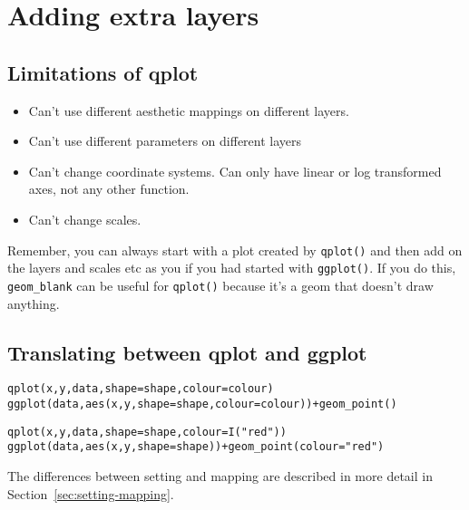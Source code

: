 


\chapter{Adding extra layers}



\section{Limitations of qplot}
\label{sec:qplot-limitations}

\begin{itemize}
  \item Can't use different aesthetic mappings on different layers.  
  \item Can't use different parameters on different layers
  \item Can't change coordinate systems.  Can only have linear or log transformed axes, not any other function.
  \item Can't change scales.
\end{itemize}

Remember, you can always start with a plot created by {\tt qplot()} and then add on the layers and scales etc as you if you had started with {\tt ggplot()}.  If you do this, {\tt geom\_blank} can be useful for {\tt qplot()} because it's a geom that doesn't draw anything.

\section{Translating between qplot and ggplot}
\label{sec:translating}


\begin{alltt}
qplot(x, y, data, shape=shape, colour = colour)
ggplot(data, aes(x, y, shape=shape, colour = colour)) + geom_point()
\end{alltt}

\begin{alltt}
qplot(x, y, data, shape=shape, colour = I("red"))
ggplot(data, aes(x, y, shape=shape)) + geom_point(colour="red")
\end{alltt}

The differences between setting and mapping are described in more detail in Section~\ref{sec:setting-mapping}.

